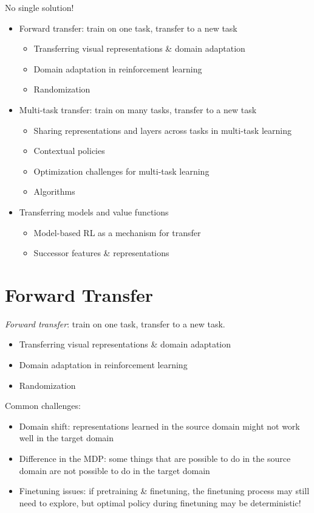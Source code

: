 No single solution!
\begin{itemize}
	\item Forward transfer: train on one task, transfer to a new task
	\begin{itemize}
		\item Transferring visual representations \& domain adaptation
		\item Domain adaptation in reinforcement learning
		\item Randomization
	\end{itemize}
	\item Multi-task transfer: train on many tasks, transfer to a new task
	\begin{itemize}
		\item Sharing representations and layers across tasks in multi-task learning
		\item Contextual policies
		\item Optimization challenges for multi-task learning
		\item Algorithms
	\end{itemize}
	\item Transferring models and value functions
	\begin{itemize}
		\item Model-based RL as a mechanism for transfer
		\item Successor features \& representations
	\end{itemize}	
\end{itemize}

\section{Forward Transfer}
\textit{Forward transfer}: train on one task, transfer to a new task.
\begin{itemize}
	\item Transferring visual representations \& domain adaptation
	\item Domain adaptation in reinforcement learning
	\item Randomization
\end{itemize}

Common challenges:
\begin{itemize}
	\item Domain shift: representations learned in the source domain might not work well in the target domain
	\item Difference in the \ac{MDP}: some things that are possible to do in the source domain are not possible to do in the target domain
	\item Finetuning issues: if pretraining \& finetuning, the finetuning process may still need to explore, but optimal policy during finetuning may be deterministic!
\end{itemize}

